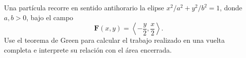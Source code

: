 Una partícula recorre en sentido antihorario la elipse $x^2/a^2+y^2/b^2=1$, donde $a,b>0$, bajo el campo
\[
\mathbf{F}(x,y)=\left\langle-\frac y2,\frac x2\right\rangle.
\]
Use el teorema de Green para calcular el trabajo realizado en una vuelta completa e interprete su relación con el área encerrada.
